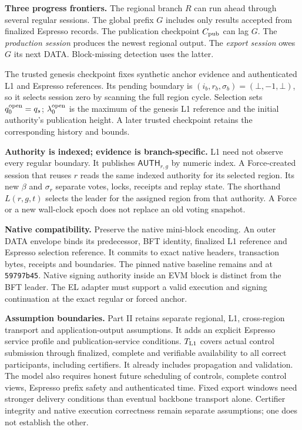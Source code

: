 \documentclass[11pt,a4paper]{article}
\newcommand{\api}[1]{\ensuremath{\mathsf{#1}}}
\newcommand{\src}[2]{\href{#1}{\texttt{\detokenize{#2}}}}
\begin{document}
\textbf{Three progress frontiers.} The regional branch $R$ can run ahead
through several regular sessions. The global prefix $G$ includes only
results accepted from finalized Espresso records. The publication
checkpoint $C_{\rm pub}$ can lag $G$. The \emph{production session}
produces the newest regional output. The \emph{export session} owes
$G$ its next DATA. Block-missing detection uses the latter.

The trusted genesis checkpoint fixes synthetic anchor evidence and
authenticated L1 and Espresso references. Its pending boundary is
$(i_b,r_b,\sigma_b)=(\bot,-1,\bot)$, so it selects session zero by
scanning the full region cycle. Selection sets $q^{\rm open}_0=q_s$;
$\lambda^{\rm open}_0$ is the maximum of the genesis L1 reference and
the initial authority's publication height. A later trusted checkpoint
retains the corresponding history and bounds.

\textbf{Authority is indexed; evidence is branch-specific.}
L1 need not observe every regular boundary. It publishes
$\api{AUTH}_{r,g}$ by numeric index. A Force-created session that reuses
$r$ reads the same indexed authority for its selected region. Its new
$\beta$ and $\sigma_r$ separate votes, locks, receipts and replay state.
The shorthand $L(r,g,t)$ selects the leader for the assigned region from
that authority. A Force or a new wall-clock epoch does not replace an
old voting snapshot.

\textbf{Native compatibility.} Preserve the native mini-block encoding.
An outer DATA envelope binds its predecessor, BFT identity, finalized
L1 reference and Espresso selection reference. It commits to exact
native headers, transaction bytes, receipts and boundaries. The pinned
native baseline remains
\src{../megaeth_specs/specs/protocol/blocks.md}{blocks.md} and
\src{../megaeth_specs/specs/protocol/state-sync.md}{state-sync.md}
at \texttt{59797b45}. Native signing authority inside an EVM block is
distinct from the BFT leader. The EL adapter must support a valid
execution and signing continuation at the exact regular or forced anchor.

\textbf{Assumption boundaries.} Part II retains separate regional,
L1, cross-region transport and application-output assumptions. It adds
an explicit Espresso service profile and publication-service conditions.
$T_{\rm L1}$ covers actual control submission through finalized,
complete and verifiable availability to all correct participants,
including certifiers. It already includes propagation and validation.
The model also requires honest future scheduling of controls, complete
control views, Espresso prefix safety and authenticated time. Fixed
export windows need stronger delivery conditions than eventual backbone
transport alone. Certifier integrity and native execution correctness
remain separate assumptions; one does not establish the other.
\end{document}
